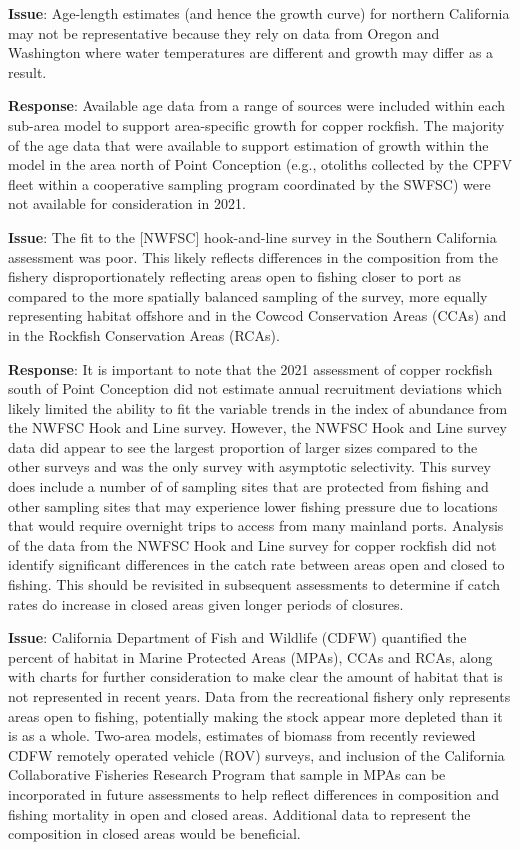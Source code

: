 \documentclass[11pt,
  english,
  letterpaper,
]{article}
\begin{document}
\textbf{Issue}: Age-length estimates (and hence the growth curve) for northern California may not be representative because they rely on data from Oregon and Washington where water temperatures are different and growth may differ as a result.

\textbf{Response}: Available age data from a range of sources were included within each sub-area model to support area-specific growth for copper rockfish. The majority of the age data that were available to support estimation of growth within the model in the area north of Point Conception (e.g., otoliths collected by the CPFV fleet within a cooperative sampling program coordinated by the SWFSC) were not available for consideration in 2021.

\textbf{Issue}: The fit to the {[}NWFSC{]} hook-and-line survey in the Southern California assessment was poor. This likely reflects differences in the composition from the fishery disproportionately reflecting areas open to fishing closer to port as compared to the more spatially balanced sampling of the survey, more equally representing habitat offshore and in the Cowcod Conservation Areas (CCAs) and in the Rockfish Conservation Areas (RCAs).

\textbf{Response}: It is important to note that the 2021 assessment of copper rockfish south of Point Conception did not estimate annual recruitment deviations which likely limited the ability to fit the variable trends in the index of abundance from the NWFSC Hook and Line survey. However, the NWFSC Hook and Line survey data did appear to see the largest proportion of larger sizes compared to the other surveys and was the only survey with asymptotic selectivity. This survey does include a number of of sampling sites that are protected from fishing and other sampling sites that may experience lower fishing pressure due to locations that would require overnight trips to access from many mainland ports. Analysis of the data from the NWFSC Hook and Line survey for copper rockfish did not identify significant differences in the catch rate between areas open and closed to fishing. This should be revisited in subsequent assessments to determine if catch rates do increase in closed areas given longer periods of closures.

\textbf{Issue}: California Department of Fish and Wildlife (CDFW) quantified the percent of habitat in Marine Protected Areas (MPAs), CCAs and RCAs, along with charts for further consideration to make clear the amount of habitat that is not represented in recent years. Data from the recreational fishery only represents areas open to fishing, potentially making the stock appear more depleted than it is as a whole. Two-area models, estimates of biomass from recently reviewed CDFW remotely operated vehicle (ROV) surveys, and inclusion of the California Collaborative Fisheries Research Program that sample in MPAs can be incorporated in future assessments to help reflect differences in composition and fishing mortality in open and closed areas. Additional data to represent the composition in closed areas would be beneficial.
\end{document}
